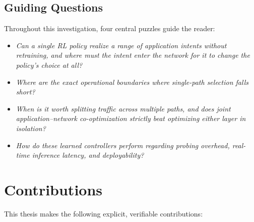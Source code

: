 \subsection{Guiding Questions}
\label{sec:intro:questions}
Throughout this investigation, four central puzzles guide the reader:
\begin{itemize}
    \item \emph{Can a single RL policy realize a range of application intents without retraining, and where must the intent enter the network for it to change the policy's choice at all?}
    \item \emph{Where are the exact operational boundaries where single-path selection falls short?}
    \item \emph{When is it worth splitting traffic across multiple paths, and does joint application--network co-optimization strictly beat optimizing either layer in isolation?}
    \item \emph{How do these learned controllers perform regarding probing overhead, real-time inference latency, and deployability?}
\end{itemize}

\section{Contributions}
\label{sec:intro:contributions}

This thesis makes the following explicit, verifiable contributions:

